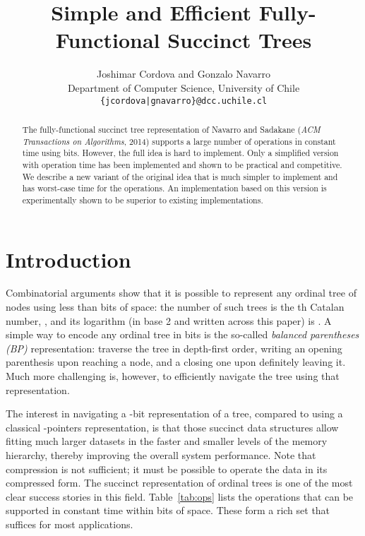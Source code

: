 \documentclass[11pt]{article}
\newcommand{\0}{\mathit{0}}
\newcommand{\1}{\mathit{1}}
\begin{document}
\title{Simple and Efficient Fully-Functional Succinct Trees}

\author{Joshimar Cordova and Gonzalo Navarro \\
Department of Computer Science, University of Chile \\
{\tt \{jcordova|gnavarro\}@dcc.uchile.cl}}

\maketitle 

\begin{abstract}
The fully-functional succinct tree representation of Navarro and Sadakane
({\em ACM Transactions on Algorithms}, 2014) supports a large number of
operations in constant time using  bits. 
However, the full idea is hard to implement. Only a simplified version with
 operation time has been implemented and shown to be practical 
and competitive. We describe a new variant of the original idea that is much 
simpler to implement and has worst-case time  for the 
operations. An implementation based on this version is experimentally shown to
be superior to existing implementations.
\end{abstract}

\section{Introduction}

Combinatorial arguments show that it is possible to represent any ordinal
tree of  nodes using less than  bits of space: the number of such trees
is the th Catalan number, , and its
logarithm (in base 2 and written  across this paper) is . A simple way to
encode any ordinal tree in  bits is the so-called {\em balanced
parentheses (BP)} representation: traverse the tree in depth-first order,
writing an opening parenthesis upon reaching a node, and a closing one upon
definitely leaving it. Much more challenging is, however, to efficiently
navigate the tree using that representation.

The interest in navigating a -bit representation of a tree, compared to
using a classical -pointers representation, is that those succinct
data structures allow fitting much larger datasets in the faster and
smaller levels of the memory hierarchy, thereby improving the overall system
performance. Note that compression is not sufficient; it must be possible to
operate the data in its compressed form. The succinct representation of 
ordinal trees is one of the most clear success stories in this field. 
Table~\ref{tab:ops} lists the operations that can be supported in constant 
time within  bits of space. These form a rich set that suffices for
most applications.
\end{document}
